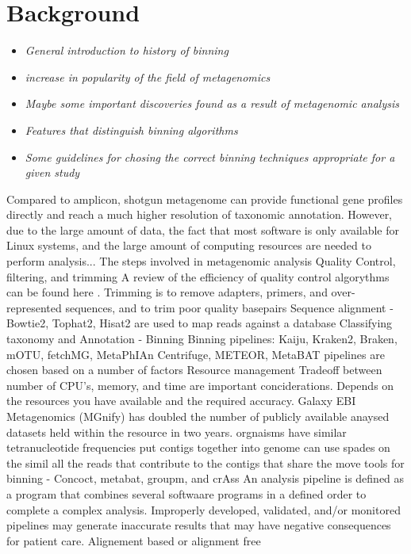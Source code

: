 \documentclass{article}
\begin{document}
\section{Background}
\begin{itemize}
	\item \emph{General introduction to history of binning}
	\item \emph{increase in popularity of the field of metagenomics}
	\item \emph{Maybe some important discoveries found as a result of metagenomic analysis}
	\item \emph{Features that distinguish binning algorithms}
	\item \emph{Some guidelines for chosing the correct binning techniques appropriate for a given study}
\end{itemize}
Compared to amplicon, shotgun metagenome can provide functional gene profiles directly and reach a much higher resolution of taxonomic annotation.
However, due to the large amount of data, the fact that most software is only available for Linux systems, and the large amount of computing resources are needed to perform analysis...
The steps involved in metagenomic analysis
Quality Control, filtering, and trimming
A review of the efficiency of quality control algorythms can be found here \cite{zhou2014assessment}.
Trimming is to remove adapters, primers, and over-represented sequences, and to trim poor quality basepairs
Sequence alignment - Bowtie2, Tophat2, Hisat2 are used to map reads against a database
Classifying taxonomy and Annotation - Binning
Binning pipelines: Kaiju, Kraken2, Braken, mOTU, fetchMG, MetaPhIAn Centrifuge, METEOR, MetaBAT
pipelines are chosen based on a number of factors
Resource management
Tradeoff between number of CPU's, memory, and time are important conciderations.
Depends on the resources you have available and the required accuracy.
Galaxy
EBI Metagenomics (MGnify) has doubled the number of publicly available anaysed datasets held within the resource in two years.
orgnaisms have similar tetranucleotide frequencies put contigs together into genome
can use spades on the simil
all the reads that contribute to the contigs that share the move
tools for binning - Concoct, metabat, groupm, and crAss
An analysis pipeline is defined as a program that combines several softwaare programs in a defined order to complete a complex analysis.
Improperly developed, validated, and/or monitored pipelines may generate inaccurate results that may have negative consequences for patient care.
Alignement based or alignment free
\end{document}
